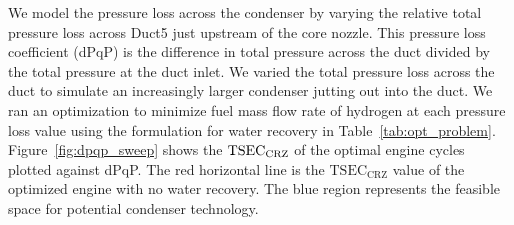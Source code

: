 \documentclass[conf]{new-aiaa}
\begin{document}
We model the pressure loss across the condenser by varying the relative total pressure loss across Duct5 just upstream of the core nozzle.
This pressure loss coefficient (dPqP) is the difference in total pressure across the duct divided by the total pressure at the duct inlet.
We varied the total pressure loss across the duct to simulate an increasingly larger condenser jutting out into the duct.
We ran an optimization to minimize fuel mass flow rate of hydrogen at each pressure loss value using the formulation for water recovery in Table~\ref{tab:opt_problem}.
Figure~\ref{fig:dpqp_sweep} shows the $\rm{TSEC}_{\rm{CRZ}}$ of the optimal engine cycles plotted against dPqP.
The red horizontal line is the $\text{TSEC}_\text{CRZ}$ value of the optimized engine with no water recovery.
The blue region represents the feasible space for potential condenser technology.
\end{document}
